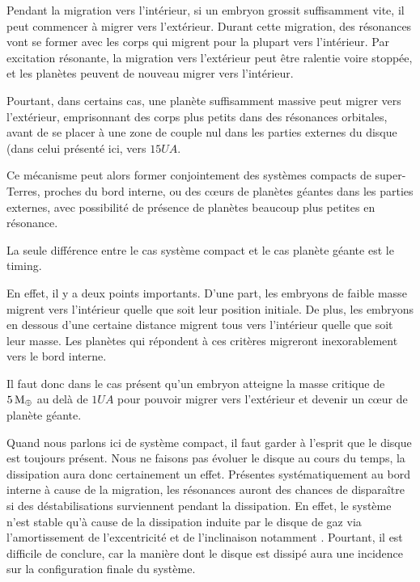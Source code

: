 Pendant la migration vers l'intérieur, si un embryon grossit suffisamment vite, il peut commencer à migrer vers l'extérieur. Durant cette migration, des résonances vont se former avec les corps qui migrent pour la plupart vers l'intérieur. Par excitation résonante, la migration vers l'extérieur peut être ralentie voire stoppée, et les planètes peuvent de nouveau migrer vers l'intérieur. 

Pourtant, dans certains cas, une planète suffisamment massive peut migrer vers l'extérieur, emprisonnant des corps plus petits dans des résonances orbitales, avant de se placer à une zone de couple nul dans les parties externes du disque (dans celui présenté ici, vers $15\unit{UA}$.

\bigskip

Ce mécanisme peut alors former conjointement des systèmes compacts de super-Terres, proches du bord interne, ou des cœurs de
planètes géantes dans les parties externes, avec possibilité de présence de planètes beaucoup plus petites en résonance. 

La seule différence entre le cas système compact et le cas planète géante est le timing. 

En effet, il y a deux points importants. D'une part, les embryons de faible masse migrent vers l'intérieur quelle que soit leur position initiale. De plus, les embryons en dessous d'une certaine distance migrent tous vers l'intérieur quelle que soit leur masse. Les planètes qui répondent à ces critères migreront inexorablement vers le bord interne. 

Il faut donc dans le cas présent qu'un embryon atteigne la masse critique de $5\mathrm{\thinspace M_\oplus}$ au delà de $1\unit{UA}$ pour pouvoir migrer vers l'extérieur et devenir un cœur de planète géante.

\bigskip

Quand nous parlons ici de système compact, il faut garder à l'esprit que le disque est toujours présent. Nous ne faisons pas évoluer le disque au cours du temps, la dissipation aura donc certainement un effet. Présentes systématiquement au bord interne à cause de la migration, les résonances auront des chances de disparaître si des déstabilisations surviennent pendant la dissipation. En effet, le système n'est stable qu'à cause de la dissipation induite par le disque de gaz via l'amortissement de l'excentricité et de l'inclinaison notamment \citep{kominami2004formation}. Pourtant, il est difficile de conclure, car la manière dont le disque est dissipé aura une incidence sur la configuration finale du système. 

